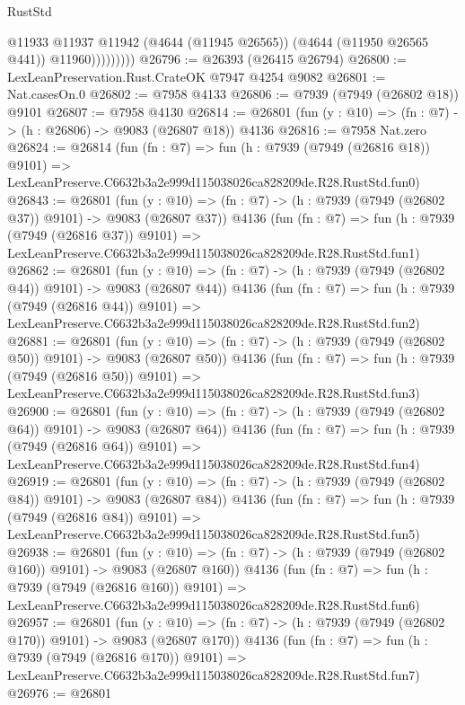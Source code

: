 \begin{lexlean}{RustStd}
\begin{coremodule}
                      @11933
                      @11937
                      @11942
                      (@4644 (@11945 @26565))
                      (@4644 (@11950 @26565 @441))
                      @11960)))))))))
@26796 := @26393 (@26415 @26794)
@26800 := LexLeanPreservation.Rust.CrateOK @7947 @4254 @9082
@26801 := Nat.casesOn.{0}
@26802 := @7958 @4133
@26806 := @7939 (@7949 (@26802 @18)) @9101
@26807 := @7958 @4130
@26814 := @26801 (fun (y : @10) => (fn : @7) -> (h : @26806) -> @9083 (@26807 @18)) @4136
@26816 := @7958 Nat.zero
@26824 := @26814
    (fun (fn : @7) =>
    fun (h : @7939 (@7949 (@26816 @18)) @9101) =>
    LexLeanPreserve.C6632b3a2e999d115038026ca828209de.R28.RustStd.fun0)
@26843 := @26801
    (fun (y : @10) => (fn : @7) -> (h : @7939 (@7949 (@26802 @37)) @9101) -> @9083 (@26807 @37))
    @4136
    (fun (fn : @7) =>
    fun (h : @7939 (@7949 (@26816 @37)) @9101) =>
    LexLeanPreserve.C6632b3a2e999d115038026ca828209de.R28.RustStd.fun1)
@26862 := @26801
    (fun (y : @10) => (fn : @7) -> (h : @7939 (@7949 (@26802 @44)) @9101) -> @9083 (@26807 @44))
    @4136
    (fun (fn : @7) =>
    fun (h : @7939 (@7949 (@26816 @44)) @9101) =>
    LexLeanPreserve.C6632b3a2e999d115038026ca828209de.R28.RustStd.fun2)
@26881 := @26801
    (fun (y : @10) => (fn : @7) -> (h : @7939 (@7949 (@26802 @50)) @9101) -> @9083 (@26807 @50))
    @4136
    (fun (fn : @7) =>
    fun (h : @7939 (@7949 (@26816 @50)) @9101) =>
    LexLeanPreserve.C6632b3a2e999d115038026ca828209de.R28.RustStd.fun3)
@26900 := @26801
    (fun (y : @10) => (fn : @7) -> (h : @7939 (@7949 (@26802 @64)) @9101) -> @9083 (@26807 @64))
    @4136
    (fun (fn : @7) =>
    fun (h : @7939 (@7949 (@26816 @64)) @9101) =>
    LexLeanPreserve.C6632b3a2e999d115038026ca828209de.R28.RustStd.fun4)
@26919 := @26801
    (fun (y : @10) => (fn : @7) -> (h : @7939 (@7949 (@26802 @84)) @9101) -> @9083 (@26807 @84))
    @4136
    (fun (fn : @7) =>
    fun (h : @7939 (@7949 (@26816 @84)) @9101) =>
    LexLeanPreserve.C6632b3a2e999d115038026ca828209de.R28.RustStd.fun5)
@26938 := @26801
    (fun (y : @10) => (fn : @7) -> (h : @7939 (@7949 (@26802 @160)) @9101) -> @9083 (@26807 @160))
    @4136
    (fun (fn : @7) =>
    fun (h : @7939 (@7949 (@26816 @160)) @9101) =>
    LexLeanPreserve.C6632b3a2e999d115038026ca828209de.R28.RustStd.fun6)
@26957 := @26801
    (fun (y : @10) => (fn : @7) -> (h : @7939 (@7949 (@26802 @170)) @9101) -> @9083 (@26807 @170))
    @4136
    (fun (fn : @7) =>
    fun (h : @7939 (@7949 (@26816 @170)) @9101) =>
    LexLeanPreserve.C6632b3a2e999d115038026ca828209de.R28.RustStd.fun7)
@26976 := @26801

\end{coremodule}
\end{lexlean}
